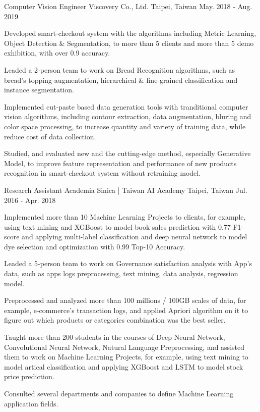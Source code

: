 \begin{cventries}
  \cventry
    {Computer Vision Engineer} %
    {Viscovery Co., Ltd.} %
    {Taipei, Taiwan} %
    {May. 2018 - Aug. 2019} %
    {
      \begin{cvitems} %
        \item {Developed smart-checkout system with the algorithms including Metric Learning, Object Detection \& Segmentation, to more than 5 clients and more than 5 demo exhibition, with over 0.9 accuracy.}
        \item {Leaded a 2-person team to work on Bread Recognition algorithms, such as bread's topping augmentation, hierarchical \& fine-grained classification and instance segmentation.}
        \item {Implemented cut-paste based data generation tools with tranditional computer vision algorithms, including contour extraction, data augmentation, bluring and color space processing, to increase quantity and variety of training data, while reduce cost of data collection.}
        \item {Studied, and evaluated new and the cutting-edge method, especially Generative Model, to improve feature representation and performance of new products recognition in smart-checkout system without retraining model.}
      \end{cvitems}
    }

  \cventry
    {Research Assistant} %
    {Academia Sinica | Taiwan AI Academy} %
    {Taipei, Taiwan} %
    {Jul. 2016 - Apr. 2018} %
    {
      \begin{cvitems} %
        \item {Implemented more than 10 Machine Learning Projects to clients, for example, using text mining and XGBoost to model book sales prediction with 0.77 F1-score and applying multi-label classification and deep neural network to model dye selection and optimization with 0.99 Top-10 Accuracy.}
        \item {Leaded a 5-person team to work on Governance satisfaction analysis with App's data, such as apps logs preprocessing, text mining, data analysis, regression model.}
        \item {Preprocessed and analyzed more than 100 millions / 100GB scales of data, for example, e-commerce's transaction logs, and applied Apriori algorithm on it to figure out which products or categories combination was the best seller.}
        \item {Taught more than 200 students in the courses of Deep Neural Network, Convolutional Neural Network, Natural Language Preprocessing, and assisted them to work on Machine Learning Projects, for example, using text mining to model artical classification and applying XGBoost and LSTM to model stock price prediction.}
        \item {Consulted several departments and companies to define Machine Learning application fields.}
      \end{cvitems}
    }


\end{cventries}
